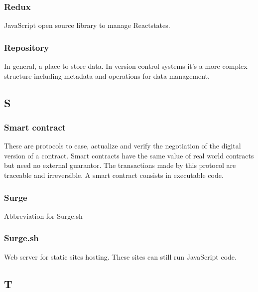 \subsubsection*{Redux}
JavaScript open source library to manage React\glosp states.

\subsubsection*{Repository}
In general, a place to store data. In version control systems it's a more complex structure including metadata and operations for data management.


\subsection*{S}

\subsubsection*{Smart contract}
These are protocols to ease, actualize and verify the negotiation of the digital version of a contract. Smart contracts have the same value of real world contracts but need no external guarantor. The transactions made by this protocol are traceable and irreversible. A smart contract consists in executable code.


\subsubsection*{Surge}
Abbreviation for Surge.sh

\subsubsection*{Surge.sh}
Web server for static sites hosting. These sites can still run JavaScript code.


\subsection*{T}

